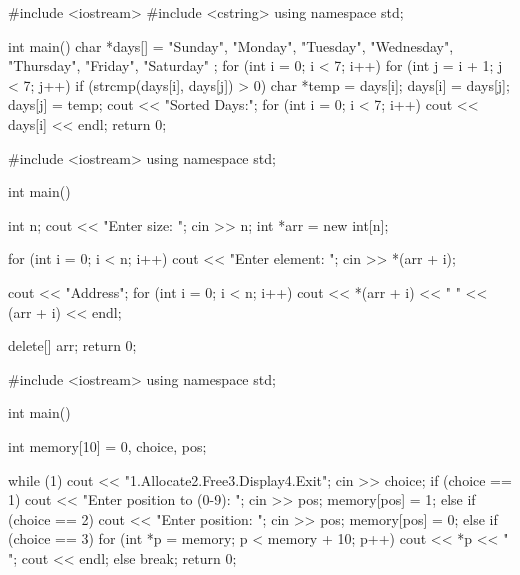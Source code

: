 \codelabel

\begin{code}
#include <iostream>
#include <cstring>
using namespace std;

int main() {
    char *days[] = { "Sunday", "Monday", "Tuesday", "Wednesday", "Thursday", "Friday", "Saturday" };
    for (int i = 0; i < 7; i++) {
        for (int j = i + 1; j < 7; j++) {
            if (strcmp(days[i], days[j]) > 0) {
                char *temp = days[i]; days[i] = days[j]; days[j] = temp;
            }
        }
    }
    cout << "Sorted Days:\n";
    for (int i = 0; i < 7; i++) cout << days[i] << endl;
    return 0;
}
\end{code}

\outputlabel
{}


\codelabel

\begin{code}
#include <iostream>
using namespace std;

int main() {
    int n;
    cout << "Enter size: "; cin >> n;
    int *arr = new int[n];

    for (int i = 0; i < n; i++) {
        cout << "Enter element: "; cin >> *(arr + i);
    }

    cout << "\nValue    Address\n";
    for (int i = 0; i < n; i++) cout << *(arr + i) << "       " << (arr + i) << endl;

    delete[] arr;
    return 0;
}
\end{code}

\outputlabel
{}


\codelabel

\begin{code}
#include <iostream>
using namespace std;

int main() {
    int memory[10] = {0}, choice, pos;

    while (1) {
        cout << "\n1.Allocate\n2.Free\n3.Display\n4.Exit\n"; cin >> choice;
        if (choice == 1) {
            cout << "Enter position to (0-9): "; cin >> pos; memory[pos] = 1;
        } else if (choice == 2) {
            cout << "Enter position: "; cin >> pos; memory[pos] = 0;
        } else if (choice == 3) {
            for (int *p = memory; p < memory + 10; p++) cout << *p << " ";
            cout << endl;
        } else break;
    }
    return 0;
}
\end{code}

\outputlabel
{}

